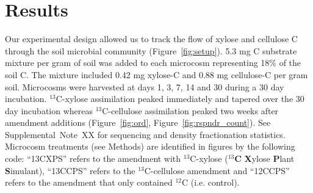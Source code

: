 \section{Results}
Our experimental design allowed us to track the flow of xylose and cellulose
C through the soil microbial community (Figure~\ref{fig:setup}).
5.3 mg C substrate mixture per gram of soil was added to each
microcosm representing 18\% of the soil C. The mixture included 0.42 mg
xylose-C and 0.88 mg cellulose-C per gram soil. Microcosms were harvested at
days 1, 3, 7, 14 and 30 during a 30 day incubation. $^{13}$C-xylose
assimilation peaked immediately and tapered over the 30 day incubation whereas
$^{13}$C-cellulose assimilation peaked two weeks after amendment additions
(Figure~\ref{fig:ord}, Figure~\ref{fig:rspndr_count}). See Supplemental~Note~XX
for sequencing and density fractionation statistics. Microcosm treatments (see
Methods) are identified in figures by the following code:
``13CXPS'' refers to the amendment with $^{13}$C-xylose ($^{13}$\textbf{C}
\textbf{X}ylose \textbf{P}lant \textbf{S}imulant), ``13CCPS'' refers to the
$^{13}$C-cellulose amendment and ``12CCPS'' refers to the amendment that only
contained $^{12}$C (i.e. control). 

